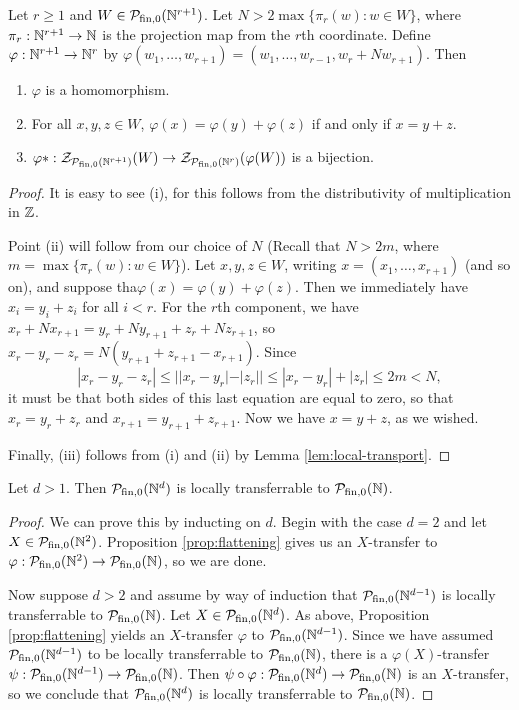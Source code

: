 \begin{prop}\label{prop:flattening}
Let $r \ge 1$ and $W\in \mathcal{P}_{\textrm{fin}, 0}(\mathbb{N}^{r+1})$.
Let $N > 2 \max\{\pi_r(w): w\in W\}$, where $\pi_r: \mathbb{N}^{r+1} \to \mathbb{N}$ is the projection map from the $r$th coordinate.
Define $\varphi: \mathbb{N}^{r+1} \to \mathbb{N}^r$ by $\varphi(w_1,\dots, w_{r+1}) = (w_1,\dots, w_{r-1},w_r + N w_{r+1})$.
Then
\begin{enumerate}[label={\rm (\roman{*})}]
	\item $\varphi$ is a homomorphism.
	\item For all $x,y,z\in W$, $\varphi(x) = \varphi(y) + \varphi(z)$ if and only if $x = y + z$.
	\item $\varphi*:\mathcal{Z}_{\mathcal{P}_{\textrm{fin}, 0}(\mathbb{N}^{r+1})}(W) \to \mathcal{Z}_{\mathcal{P}_{\textrm{fin}, 0}(\mathbb{N}^r)}(\varphi(W))$ is a bijection.
\end{enumerate}
\end{prop}
\begin{proof}
It is easy to see (i), for this follows from the distributivity of multiplication in $\mathbb{Z}$.

Point (ii) will follow from our choice of $N$ (Recall that $N > 2m$, where $m = \max\{\pi_r(w): w\in W\}$).
Let $x,y,z\in W$, writing $x = (x_1,\dots, x_{r+1})$ (and so on), and suppose tha$\varphi(x) = \varphi(y) + \varphi(z)$.
Then we immediately have $x_i = y_i + z_i$ for all $i < r$.
For the $r$th component, we have $x_r + Nx_{r+1} = y_r + Ny_{r+1} + z_r + Nz_{r+1}$, so
$x_r -y_r - z_r = N(y_{r+1}+z_{r+1}-x_{r+1})$.
Since 
\[|x_r - y_r - z_r| \le | |x_r - y_r| - |z_r| | \le |x_r-y_r| + |z_r| \le 2m < N,\]
it must be that both sides of this last equation are equal to zero, so that $x_r = y_r + z_r$ and $x_{r+1} = y_{r+1}+z_{r+1}$.
Now we have $x = y+z$, as we wished.

Finally, (iii) follows from (i) and (ii) by Lemma \ref{lem:local-transport}.
\end{proof}

\begin{thm}\label{thm:passage-to-Nd}
Let $d > 1$. 
Then $\mathcal{P}_{\textrm{fin}, 0}(\mathbb{N}^d)$ is locally transferrable to ${\mathcal{P}_{\textrm{fin},0}(\mathbb{N})}$.
\end{thm}
\begin{proof}
We can prove this by inducting on $d$.
Begin with the case $d=2$ and let $X\in \mathcal{P}_{\textrm{fin}, 0}(\mathbb{N}^2)$.
Proposition \ref{prop:flattening} gives us an $X$-transfer to $\varphi:\mathcal{P}_{\textrm{fin}, 0}(\mathbb{N}^2) \to {\mathcal{P}_{\textrm{fin},0}(\mathbb{N})}$, so we are done.

Now suppose $d>2$ and assume by way of induction that $\mathcal{P}_{\textrm{fin}, 0}(\mathbb{N}^{d-1})$ is locally transferrable to ${\mathcal{P}_{\textrm{fin},0}(\mathbb{N})}$.
Let $X\in \mathcal{P}_{\textrm{fin}, 0}(\mathbb{N}^{d})$.
As above, Proposition \ref{prop:flattening} yields an $X$-transfer $\varphi$ to $\mathcal{P}_{\textrm{fin}, 0}(\mathbb{N}^{d-1})$.
Since we have assumed $\mathcal{P}_{\textrm{fin}, 0}(\mathbb{N}^{d-1})$ to be locally transferrable to ${\mathcal{P}_{\textrm{fin},0}(\mathbb{N})}$, there is a $\varphi(X)$-transfer $\psi: \mathcal{P}_{\textrm{fin}, 0}(\mathbb{N}^{d-1}) \to {\mathcal{P}_{\textrm{fin},0}(\mathbb{N})}$.
Then $\psi\circ\varphi: \mathcal{P}_{\textrm{fin}, 0}(\mathbb{N}^d) \to {\mathcal{P}_{\textrm{fin},0}(\mathbb{N})}$ is an $X$-transfer, so we conclude that $\mathcal{P}_{\textrm{fin}, 0}(\mathbb{N}^d)$ is locally transferrable to ${\mathcal{P}_{\textrm{fin},0}(\mathbb{N})}$.
\end{proof}

